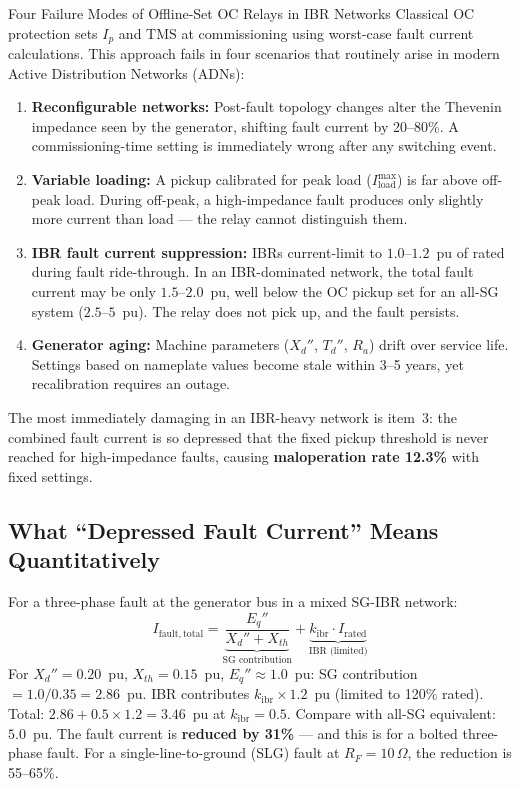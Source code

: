 \documentclass[12pt,a4paper]{article}
\newcommand{\kibr}{k_\mathrm{ibr}}
\newcommand{\TMS}{\mathrm{TMS}}
\begin{document}
\begin{warnbox}{Four Failure Modes of Offline-Set OC Relays in IBR Networks}
Classical OC protection sets $I_p$ and $\TMS$ at commissioning using worst-case fault current calculations. This approach fails in four scenarios that routinely arise in modern Active Distribution Networks (ADNs):

\begin{enumerate}[nosep]
  \item \textbf{Reconfigurable networks:} Post-fault topology changes alter the Thevenin impedance seen by the generator, shifting fault current by 20--80\%. A commissioning-time setting is immediately wrong after any switching event.
  \item \textbf{Variable loading:} A pickup calibrated for peak load ($I_\mathrm{load}^\mathrm{max}$) is far above off-peak load. During off-peak, a high-impedance fault produces only slightly more current than load --- the relay cannot distinguish them.
  \item \textbf{IBR fault current suppression:} IBRs current-limit to $1.0$--$1.2$~pu of rated during fault ride-through. In an IBR-dominated network, the total fault current may be only $1.5$--$2.0$~pu, well below the OC pickup set for an all-SG system ($2.5$--$5$~pu). The relay does not pick up, and the fault persists.
  \item \textbf{Generator aging:} Machine parameters ($X_d''$, $T_d''$, $R_a$) drift over service life. Settings based on nameplate values become stale within 3--5 years, yet recalibration requires an outage.
\end{enumerate}

The most immediately damaging in an IBR-heavy network is item~3: the combined fault current is so depressed that the fixed pickup threshold is never reached for high-impedance faults, causing \textbf{maloperation rate 12.3\%} with fixed settings.
\end{warnbox}

\subsection{What ``Depressed Fault Current'' Means Quantitatively}

For a three-phase fault at the generator bus in a mixed SG-IBR network:
\[
  I_\mathrm{fault,total} = \underbrace{\frac{E_q''}{X_d'' + X_{th}}}_{\text{SG contribution}} + \underbrace{\kibr \cdot I_\mathrm{rated}}_{\text{IBR (limited)}}
\]
For $X_d'' = 0.20$~pu, $X_{th} = 0.15$~pu, $E_q'' \approx 1.0$~pu: SG contribution $= 1.0/0.35 = 2.86$~pu. IBR contributes $\kibr \times 1.2$~pu (limited to 120\% rated). Total: $2.86 + 0.5 \times 1.2 = 3.46$~pu at $\kibr = 0.5$. Compare with all-SG equivalent: $5.0$~pu. The fault current is \textbf{reduced by 31\%} --- and this is for a bolted three-phase fault. For a single-line-to-ground (SLG) fault at $R_F = 10\,\Omega$, the reduction is 55--65\%.
\end{document}
